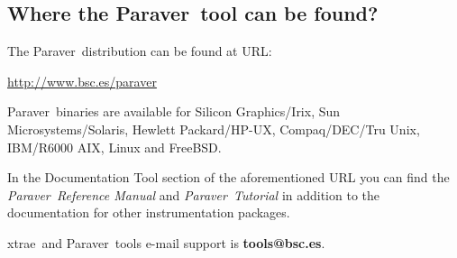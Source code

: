 \documentclass[twoside,a4,english,11pt]{book}
\newcommand{\TRACE}{{\sf {E}xtrae}\ }
\newcommand{\PARAVER}{{\sf Paraver}\ }
\begin{document}
\subsection*{Where the \PARAVER tool can be found?}

The \PARAVER distribution can be found at URL:

\url{http://www.bsc.es/paraver}

\PARAVER binaries are available for Silicon Graphics/Irix, Sun Microsystems/Solaris, Hewlett Packard/HP-UX, Compaq/DEC/Tru Unix, IBM/R6000 AIX, Linux and FreeBSD.

In the Documentation Tool section of the aforementioned URL you can find the {\em \PARAVER Reference Manual} and {\em \PARAVER Tutorial} in addition to the documentation for other instrumentation packages.

\TRACE and \PARAVER tools e-mail support is {\bf tools@bsc.es}.











\appendix








\end{document}

